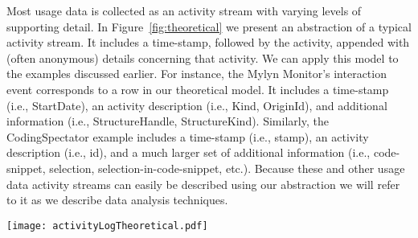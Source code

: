 Most usage data is collected as an activity stream with varying levels of supporting detail. In Figure~\ref{fig:theoretical} we present an abstraction of a typical activity stream. It includes a time-stamp, followed by the activity, appended with (often anonymous) details concerning that activity. We can apply this model to the examples discussed earlier. For instance, the Mylyn Monitor's interaction event corresponds to a row in our theoretical model. It includes a time-stamp (i.e., StartDate), an activity description (i.e., Kind, OriginId), and additional information (i.e., StructureHandle, StructureKind). Similarly, the CodingSpectator example includes a time-stamp (i.e., stamp), an activity description (i.e., id), and a much larger set of additional information (i.e., code-snippet, selection, selection-in-code-snippet, etc.). Because these and other usage data activity streams can easily be described using our abstraction we will refer to it as we describe data analysis techniques.









\begin{figure*}[t]
 \centering
\texttt{[image: activityLogTheoretical.pdf]}
\caption{Abstract model of developer activity streams.}
\label{fig:theoretical}
\end{figure*}



